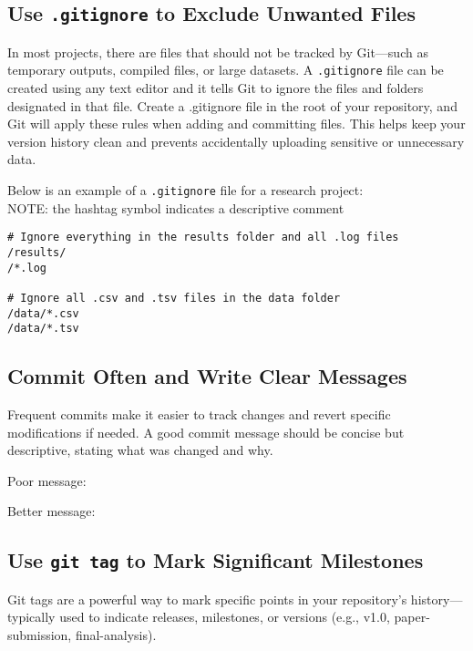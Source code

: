 \subsection*{Use \texttt{.gitignore} to Exclude Unwanted Files}
In most projects, there are files that should not be tracked by Git—such as temporary outputs, compiled files, or large datasets. A \texttt{.gitignore} file can be created using any text editor and it tells Git to ignore the files and folders designated in that file. Create a .gitignore file in the root of your repository, and Git will apply these rules when adding and committing files. This helps keep your version history clean and prevents accidentally uploading sensitive or unnecessary data.

\noindent Below is an example of a \texttt{.gitignore} file for a research project:\\
\footnotesize{NOTE: the hashtag symbol indicates a descriptive comment}
\begin{verbatim}
# Ignore everything in the results folder and all .log files
/results/
/*.log

# Ignore all .csv and .tsv files in the data folder
/data/*.csv
/data/*.tsv
\end{verbatim}

\subsection*{Commit Often and Write Clear Messages}
Frequent commits make it easier to track changes and revert specific modifications if needed. A good commit message should be concise but descriptive, stating what was changed and why.

\noindent Poor message:
\begin{terminal}
\end{terminal}
\noindent Better message:
\begin{terminal}
\end{terminal}

\subsection*{Use \texttt{git tag} to Mark Significant Milestones}
Git tags are a powerful way to mark specific points in your repository's history—typically used to indicate releases, milestones, or versions (e.g., v1.0, paper-submission, final-analysis).

